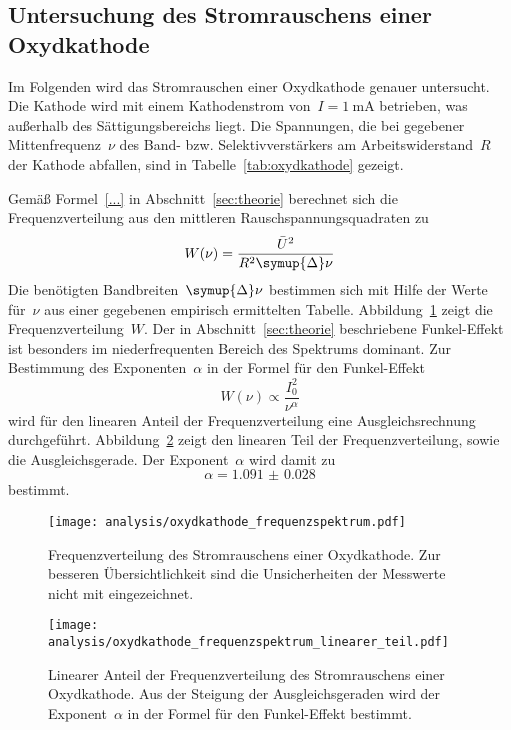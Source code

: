 \subsection{Untersuchung des Stromrauschens einer Oxydkathode}

Im Folgenden wird das Stromrauschen einer Oxydkathode genauer untersucht. Die
Kathode wird mit einem Kathodenstrom von~$I=\SI{1}{\milli\ampere}$ betrieben,
was außerhalb des Sättigungsbereichs liegt. Die Spannungen, die bei gegebener
Mittenfrequenz~$\nu$ des Band- bzw. Selektivverstärkers am Arbeitswiderstand~$R$
der Kathode abfallen, sind in Tabelle~\ref{tab:oxydkathode} gezeigt.

Gemäß Formel~\ref{...} in Abschnitt~\ref{sec:theorie} berechnet sich die
Frequenzverteilung aus den mittleren Rauschspannungsquadraten zu
%
\begin{equation}
  W(\nu)=\frac{\bar{U}^2}{R^2\symup{\Delta}\nu}
\end{equation}
%
Die benötigten Bandbreiten~$\symup{\Delta}\nu$ bestimmen sich mit Hilfe der
Werte für~$\nu$ aus einer gegebenen empirisch ermittelten Tabelle.
Abbildung~\ref{fig:oxydkathode_frequenzspektrum} zeigt die
Frequenzverteilung~$W$. Der in Abschnitt~\ref{sec:theorie} beschriebene
Funkel-Effekt ist besonders im niederfrequenten Bereich des Spektrums dominant.
Zur Bestimmung des Exponenten~$\alpha$ in der Formel für den Funkel-Effekt
%
\begin{equation}
  W(\nu)\propto\frac{I_0^2}{\nu^{\alpha}}
\end{equation}
%
wird für den linearen Anteil der Frequenzverteilung eine Ausgleichsrechnung
durchgeführt. Abbildung~\ref{fig:oxydkathode_frequenzspektrum_linearer_teil}
zeigt den linearen Teil der Frequenzverteilung, sowie die Ausgleichsgerade. Der
Exponent~$\alpha$ wird damit zu
%
\begin{equation}
  \alpha=\num{1.091(28)}
\end{equation}
%
bestimmt.

\begin{figure}[htb]
  \centering
  \texttt{[image: analysis/oxydkathode\_frequenzspektrum.pdf]}
  \caption{Frequenzverteilung des Stromrauschens einer Oxydkathode. Zur besseren
  Übersichtlichkeit sind die Unsicherheiten der Messwerte nicht mit
  eingezeichnet.}
  \label{fig:oxydkathode_frequenzspektrum}
\end{figure}

\begin{figure}[htb]
  \centering
  \texttt{[image: analysis/oxydkathode\_frequenzspektrum\_linearer\_teil.pdf]}
  \caption{Linearer Anteil der Frequenzverteilung des Stromrauschens einer
  Oxydkathode. Aus der Steigung der Ausgleichsgeraden wird der Exponent~$\alpha$
  in der Formel für den Funkel-Effekt bestimmt.}
  \label{fig:oxydkathode_frequenzspektrum_linearer_teil}
\end{figure}

